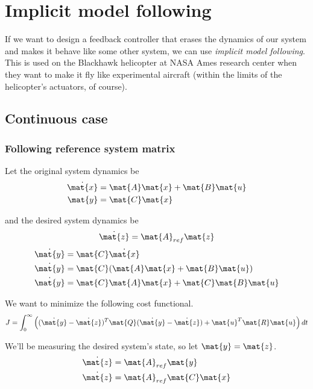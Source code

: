 \section{Implicit model following}
\label{sec:implicit_model_following}

If we want to design a feedback controller that erases the dynamics of our
system and makes it behave like some other system, we can use \textit{implicit
model following}. This is used on the Blackhawk helicopter at NASA Ames research
center when they want to make it fly like experimental aircraft (within the
limits of the helicopter's actuators, of course).

\subsection{Continuous case}

\subsubsection{Following reference system matrix}

Let the original system dynamics be
\begin{align*}
  \dot{\mat{x}} &= \mat{A}\mat{x} + \mat{B}\mat{u} \\
  \mat{y} &= \mat{C}\mat{x}
\end{align*}

and the desired system dynamics be
\begin{equation*}
  \dot{\mat{z}} = \mat{A}_{ref}\mat{z}
\end{equation*}
\begin{align*}
  \dot{\mat{y}} &= \mat{C}\dot{\mat{x}} \\
  \dot{\mat{y}} &= \mat{C}(\mat{A}\mat{x} + \mat{B}\mat{u}) \\
  \dot{\mat{y}} &= \mat{C}\mat{A}\mat{x} + \mat{C}\mat{B}\mat{u}
\end{align*}

We want to minimize the following cost functional.
\begin{equation*}
  J = \int_0^\infty \left((\dot{\mat{y}} - \dot{\mat{z}})^T \mat{Q}
    (\dot{\mat{y}} - \dot{\mat{z}}) + \mat{u}^T\mat{R}\mat{u}\right) dt
\end{equation*}

We'll be measuring the desired system's state, so let $\mat{y} = \mat{z}$.
\begin{align*}
  \dot{\mat{z}} &= \mat{A}_{ref}\mat{y} \\
  \dot{\mat{z}} &= \mat{A}_{ref}\mat{C}\mat{x}
\end{align*}

